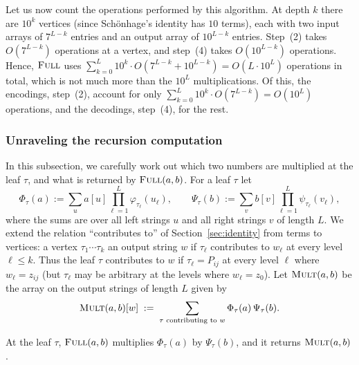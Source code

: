 Let us now count the operations performed by this algorithm. At depth $k$ there are $10^k$ vertices (since Sch\"onhage's identity has $10$ terms), each with two input arrays of $7^{L-k}$ entries and an output array of $10^{L-k}$ entries. Step~(2) takes $O(7^{L-k})$ operations at a vertex, and step~(4) takes $O(10^{L-k})$ operations. Hence, $\textnormal{\textsc{Full}}$ uses $\sum_{k=0}^{L}10^k\cdot O(7^{L-k}+10^{L-k})=O(L\cdot10^L)$ operations in total, which is not much more than the $10^L$ multiplications. Of this, the encodings, step~(2), account for only $\sum_{k=0}^{L}10^k\cdot O(7^{L-k})=O(10^L)$ operations, and the decodings, step~(4), for the rest.

\subsubsection{Unraveling the recursion computation}\label{sec:whatit}

In this subsection, we carefully work out which two numbers are multiplied at the leaf $\tau$, and what is returned by $\textnormal{\textsc{Full}}(a,b)$. For a leaf $\tau$ let
\[
\Phi_\tau(a):=\sum_u a[u]\prod_{\ell=1}^{L}\varphi_{\tau_\ell}(u_\ell),\qquad
\Psi_\tau(b):=\sum_v b[v]\prod_{\ell=1}^{L}\psi_{\tau_\ell}(v_\ell),
\]
where the sums are over all left strings $u$ and all right strings $v$ of length $L$. We extend the relation ``contributes to'' of Section~\ref{sec:identity} from terms to vertices: a vertex $\tau_1\cdots\tau_k$  an output string $w$ if $\tau_\ell$ contributes to $w_\ell$ at every level $\ell\le k$. Thus the leaf $\tau$ contributes to $w$ if $\tau_\ell=P_{ij}$ at every level $\ell$ where $w_\ell = z_{ij}$ (but $\tau_\ell$ may be arbitrary at the levels where $w_\ell = z_0$). Let $\textnormal{\textsc{Mult}}(a,b)$ be the array on the output strings of length $L$ given by
\begin{equation}\label{eq:multdef}
\textnormal{\textsc{Mult}}(a,b)[w]\;:=\;\sum_{\tau\text{ contributing to }w}\Phi_\tau(a)\,\Psi_\tau(b).
\end{equation}

\begin{lemma}\label{lem:recursion}
At the leaf $\tau$, $\textnormal{\textsc{Full}}(a,b)$ multiplies $\Phi_\tau(a)$ by $\Psi_\tau(b)$, and it returns $\textnormal{\textsc{Mult}}(a,b)$.
\end{lemma}

